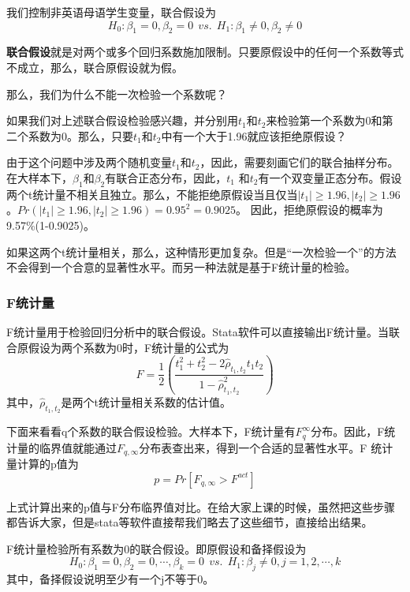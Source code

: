 \documentclass[cn,12pt,math=newtx,citestyle=gb7714-2015,bibstyle=gb7714-2015]{elegantbook}
\begin{document}
	我们控制非英语母语学生变量，联合假设为
	\begin{equation}
		H_0:\beta_1=0,\beta_2=0~~vs.~~H_1:\beta_1\neq0,\beta_2\neq0
	\end{equation}
	
	\textbf{联合假设}就是对两个或多个回归系数施加限制。只要原假设中的任何一个系数等式不成立，那么，联合原假设就为假。
	
	那么，我们为什么不能一次检验一个系数呢？
	
	如果我们对上述联合假设检验感兴趣，并分别用$t_1$和$t_2$来检验第一个系数为0和第二个系数为0。那么，只要$t_1$和$t_2$中有一个大于1.96就应该拒绝原假设？
	
	由于这个问题中涉及两个随机变量$t_1$和$t_2$，因此，需要刻画它们的联合抽样分布。在大样本下，$\beta_1$和$\beta_2$有联合正态分布，因此，$t_1$ 和$t_2$有一个双变量正态分布。假设两个t统计量不相关且独立。那么，不能拒绝原假设当且仅当$|t_1|\geq1.96,|t_2|\geq1.96$。$Pr(|t_1|\geq1.96,|t_2|\geq1.96)=0.95^2=0.9025$。 因此，拒绝原假设的概率为9.57\%(1-0.9025)。
	
	如果这两个t统计量相关，那么，这种情形更加复杂。但是“一次检验一个”的方法不会得到一个合意的显著性水平。而另一种法就是基于F统计量的检验。
	
	\subsubsection{F统计量}
	F统计量用于检验回归分析中的联合假设。Stata软件可以直接输出F统计量。当联合原假设为两个系数为0时，F统计量的公式为
	\begin{equation}
		F=\frac{1}{2}(\frac{t_1^2+t_2^2-2\hat{\rho}_{t_1,t_2}t_1t_2}{1-\hat{\rho}_{t_1,t_2}^2})
	\end{equation}
	其中，$\hat{\rho}_{t_1,t_2}$是两个t统计量相关系数的估计值。
	
	下面来看看q个系数的联合假设检验。大样本下，F统计量有$F_q^\infty$分布。因此，F统计量的临界值就能通过$F_{q,\infty}$分布表查出来，得到一个合适的显著性水平。F 统计量计算的p值为
	\begin{equation}
		p=Pr[F_{q,\infty}>F^{act}]
	\end{equation}
	
	上式计算出来的p值与F分布临界值对比。在给大家上课的时候，虽然把这些步骤都告诉大家，但是stata等软件直接帮我们略去了这些细节，直接给出结果。
	
	F统计量检验所有系数为0的联合假设。即原假设和备择假设为
	\begin{equation}
		H_0:\beta_1=0,\beta_2=0,\cdots,\beta_k=0~~vs.~~H_1:\beta_j\neq0,j=1,2,\cdots,k
	\end{equation}
	其中，备择假设说明至少有一个j不等于0。
	
\end{document}
